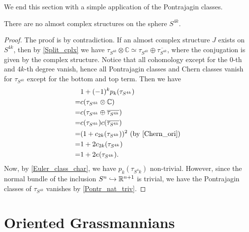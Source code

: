	We end this section with a simple application of the Pontrajagin classes. 
	\begin{thm}
		There are no almost complex structures on the sphere $S^{4k}$. 
	\end{thm}
	\begin{proof}
		The proof is by contradiction. If an almost complex structure $J$ exists on $S^{4k}$, then by \cref{Split_cplx} we have $\tau_{S^{4k}}\otimes\mathbb{C}\simeq\tau_{S^{4k}}\oplus\overline{\tau_{S^{4k}}}$, where the conjugation is given by the complex structure. 
		Notice that all cohomology except for the $0$-th and $4k$-th degree vanish, hence all Pontrajagin classes and Chern classes vanish for $\tau_{S^{4k}}$ except for the bottom and top term. Then we have
		\begin{align*}
			&1+(-1)^kp_k(\tau_{S^{4k}}) \\
			=&c(\tau_{S^{4k}}\otimes\mathbb{C}) \\
			=&c(\tau_{S^{4k}}\oplus\overline{\tau_{S^{4k}}}) \\
			=&c(\tau_{S^{4k}})c(\overline{\tau_{S^{4k}}}) \\
			=&(1+c_{2k}(\tau_{S^{4k}}))^2~\text{(by~\cref{Chern_ori})} \\
			=&1+2c_{2k}(\tau_{S^{4k}}) \\
			=&1+2e(\tau_{S^{4k}}). 
		\end{align*}
		Now, by \cref{Euler_class_char}, we have $p_k(\tau_{S^4k})$ non-trivial. However, since the normal bundle of the inclusion $S^n\hookrightarrow\mathbb{R}^{n+1}$ is trivial, we have the Pontrajagin classes of $\tau_{S^{4k}}$ vanishes by \cref{Pontr_nat_triv}. 
	\end{proof}

\section{Oriented Grassmannians}


